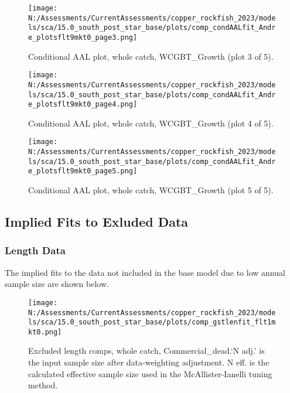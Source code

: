 \documentclass[11pt,
  english,
  letterpaper,
]{article}
\begin{document}
\begin{figure}
\centering
\texttt{[image: N:/Assessments/CurrentAssessments/copper\_rockfish\_2023/models/sca/15.0\_south\_post\_star\_base/plots/comp\_condAALfit\_Andre\_plotsflt9mkt0\_page3.png]}
\caption{Conditional AAL plot, whole catch, WCGBT\_Growth (plot 3 of 5).\label{fig:comp_condAALfit_Andre_plotsflt9mkt0_page3}}
\end{figure}

\begin{figure}
\centering
\texttt{[image: N:/Assessments/CurrentAssessments/copper\_rockfish\_2023/models/sca/15.0\_south\_post\_star\_base/plots/comp\_condAALfit\_Andre\_plotsflt9mkt0\_page4.png]}
\caption{Conditional AAL plot, whole catch, WCGBT\_Growth (plot 4 of 5).\label{fig:comp_condAALfit_Andre_plotsflt9mkt0_page4}}
\end{figure}

\begin{figure}
\centering
\texttt{[image: N:/Assessments/CurrentAssessments/copper\_rockfish\_2023/models/sca/15.0\_south\_post\_star\_base/plots/comp\_condAALfit\_Andre\_plotsflt9mkt0\_page5.png]}
\caption{Conditional AAL plot, whole catch, WCGBT\_Growth (plot 5 of 5).\label{fig:comp_condAALfit_Andre_plotsflt9mkt0_page5}}
\end{figure}

\pagebreak

\hypertarget{excluded-data}{%
\subsection{Implied Fits to Exluded Data}\label{excluded-data}}

\hypertarget{length-data-1}{%
\subsubsection{Length Data}\label{length-data-1}}

The implied fits to the data not included in the base model due to low annual sample size are shown below.

\begin{figure}
\centering
\texttt{[image: N:/Assessments/CurrentAssessments/copper\_rockfish\_2023/models/sca/15.0\_south\_post\_star\_base/plots/comp\_gstlenfit\_flt1mkt0.png]}
\caption{Excluded length comps, whole catch, Commercial\_dead.`N adj.' is the input sample size after data-weighting adjustment. N eff. is the calculated effective sample size used in the McAllister-Ianelli tuning method.\label{fig:comp_gstlenfit_flt1mkt0}}
\end{figure}
\end{document}
